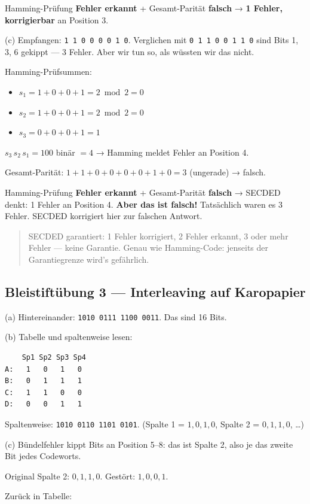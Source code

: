 Hamming-Prüfung \textbf{Fehler erkannt} + Gesamt-Parität \textbf{falsch}
→ \textbf{1 Fehler, korrigierbar} an Position 3. \checkmark

(c) Empfangen: \texttt{1 1 0 0 0 0 1 0}. Verglichen mit \texttt{0 1 1
0 0 1 1 0} sind Bits 1, 3, 6 gekippt — 3 Fehler. Aber wir tun so, als
wüssten wir das nicht.

Hamming-Prüfsummen:
\begin{itemize}
\item $s_1 = 1+0+0+1 = 2 \bmod 2 = 0$
\item $s_2 = 1+0+0+1 = 2 \bmod 2 = 0$
\item $s_3 = 0+0+0+1 = 1$
\end{itemize}
$s_3\, s_2\, s_1 = 100$ binär $= 4$ → Hamming meldet Fehler an Position
4.

Gesamt-Parität: $1+1+0+0+0+0+1+0 = 3$ (ungerade) → falsch.

Hamming-Prüfung \textbf{Fehler erkannt} + Gesamt-Parität \textbf{falsch}
→ SECDED denkt: 1 Fehler an Position 4. \textbf{Aber das ist falsch!}
Tatsächlich waren es 3 Fehler. SECDED korrigiert hier zur falschen
Antwort.

\begin{quote}
SECDED garantiert: 1 Fehler korrigiert, 2 Fehler erkannt, 3 oder mehr
Fehler — keine Garantie. Genau wie Hamming-Code: jenseits der
Garantiegrenze wird's gefährlich.
\end{quote}

\subsection*{Bleistiftübung 3 — Interleaving auf Karopapier}

(a) Hintereinander: \texttt{1010 0111 1100 0011}. Das sind 16 Bits.

(b) Tabelle und spaltenweise lesen:

\begin{verbatim}
    Sp1 Sp2 Sp3 Sp4
A:   1   0   1   0
B:   0   1   1   1
C:   1   1   0   0
D:   0   0   1   1
\end{verbatim}

Spaltenweise: \texttt{1010 0110 1101 0101}. (Spalte 1 = $1,0,1,0$,
Spalte 2 = $0,1,1,0$, …)

(c) Bündelfehler kippt Bits an Position 5–8: das ist Spalte 2, also je
das zweite Bit jedes Codeworts.

Original Spalte 2: $0,1,1,0$. Gestört: $1,0,0,1$.

Zurück in Tabelle:

